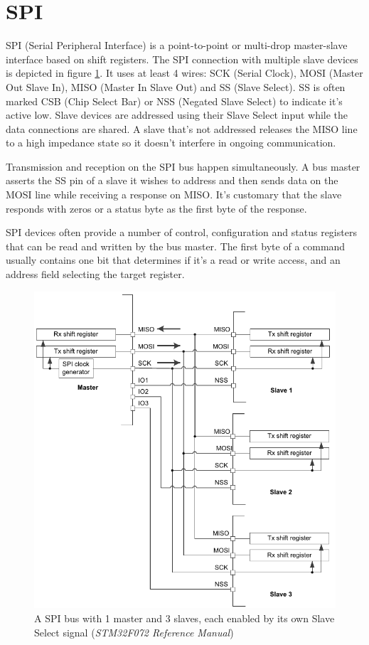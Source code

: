 
\section{SPI}

SPI (Serial Peripheral Interface) is a point-to-point or multi-drop master-slave interface based on shift registers. The SPI connection with multiple slave devices is depicted in figure \ref{fig:spi-multislave}. It uses at least 4 wires: SCK (Serial Clock), MOSI (Master Out Slave In), MISO (Master In Slave Out) and SS (Slave Select). SS is often marked CSB (Chip Select Bar) or NSS (Negated Slave Select) to indicate it's active low. Slave devices are addressed using their Slave Select input while the data connections are shared. A slave that's not addressed releases the MISO line to a high impedance state so it doesn't interfere in ongoing communication.

Transmission and reception on the SPI bus happen simultaneously. A bus master asserts the SS pin of a slave it wishes to address and then sends data on the MOSI line while receiving a response on MISO. It's customary that the slave responds with zeros or a status byte as the first byte of the response.

SPI devices often provide a number of control, configuration and status registers that can be read and written by the bus master. The first byte of a command usually contains one bit that determines if it's a read or write access, and an address field selecting the target register.

\begin{figure}
	\centering
	\includegraphics[width=.9\textwidth] {img/spi-multislave.png}
	\caption{\label{fig:spi-multislave}A SPI bus with 1 master and 3 slaves, each enabled by its own Slave Select signal (\textit{STM32F072 Reference Manual})}
\end{figure}

